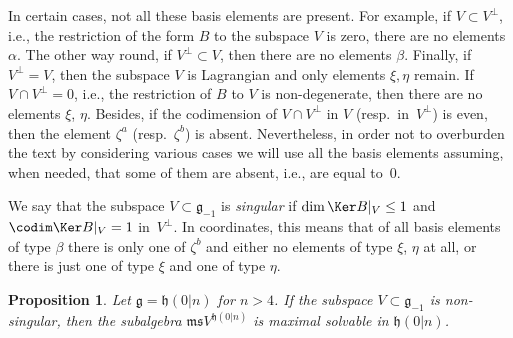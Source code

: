 \documentclass[pdftex]{sigma}
\newcommand {\fg} {{\mathfrak{g}}} %
\newcommand {\fh} {{\mathfrak{h}}}
\newcommand {\fm} {{\mathfrak{m}}}
\newcommand {\fs} {{\mathfrak{s}}}
\newcommand {\<} [2] {{\left.\vphantom{#2}\right.^{#1\!}\!{#2}}}
\numberwithin{equation}{section}
\newtheorem{Proposition}[Theorem]{Proposition}
\begin{document}
In certain cases, not all these basis elements are present. For example, if $V\subset V^\perp$, i.e., the restriction of the form $B$ to the subspace $V$ is zero, there are no elements $\alpha$. The other way round, if $V^\perp\subset V$, then there are no elements $\beta$. Finally, if $V^\perp=V$, then the subspace $V$ is Lagrangian and only elements $\xi, \eta$ remain. If $V\cap V^\perp=0$, i.e., the restriction of $B$ to $V$ is non-degenerate, then there are no elements $\xi$, $\eta$.
Besides, if the codimension of $V\cap V^\perp$ in $V$ (resp.\ in~$V^\perp$) is even, then the element $\zeta^a$ (resp.\ $\zeta^b$) is absent. Nevertheless, in order not to overburden the text by considering various cases we will use all the basis elements assuming, when needed, that some of them are absent, i.e., are equal to~0.

We say that the subspace $V\subset \fg_{-1}$ is \textit{singular} if $\dim \Ker B|_V\leq 1$ and $\codim \Ker B|_V=1$ in~$V^\perp$.
In coordinates, this means that of all basis elements of type $\beta$ there is only one of $\zeta^b$ and either no elements of type $\xi$, $\eta$ at all, or there is just one of type $\xi$ and one of type $\eta$.

\begin{Proposition}\label{ThH} Let $\fg=\fh(0|n)$ for $n>4$. If the subspace $V\subset \fg_{-1}$ is non-singular, then the subalgebra $\fm\fs V^{\fh(0|n)}$ is maximal solvable in $\fh(0|n)$.
\end{Proposition}
\end{document}

